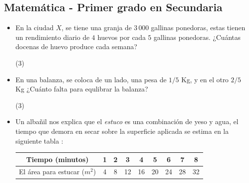 \documentclass[12pt, twocolumn, landscape, a4paper]{article}
\begin{document}
\subsection*{Matemática - Primer grado en Secundaria}
\begin{itemize}
\item{En la ciudad $X$, se tiene una granja de $3\,000$ gallinas ponedoras, estas tienen un rendimiento diario de $4$ huevos por cada $5$ gallinas ponedoras. ¿Cuántas docenas de huevo produce cada semana?
\begin{tasks}(3)
\end{tasks}
}
\item{En una balanza, se coloca de un lado, una pesa de \;\;$1/5$ Kg, y en el otro \;\;$2/5$ Kg ¿Cuánto falta para equlibrar la balanza?
\begin{tasks}(3)
\end{tasks}
}
\item{Un albañil nos explica que el \emph{estuco} es una combinación de yeso y agua, el tiempo que demora en secar sobre la superficie aplicada se estima en la siguiente tabla :

\begin{center}
	\begin{tabular}{|c|c|c|c|c|c|c|c|c|}
		\hline
		Tiempo (minutos) & 1 & 2 & 3 & 4 & 5 & 6 & 7 & 8 \\
		\hline
		El área para estucar ($m^2$) & 4 & 8 & 12 & 16 & 20 & 24 & 28 & 32 \\
		\hline
	\end{tabular}
\end{center}

}
\end{itemize}
\end{document}
